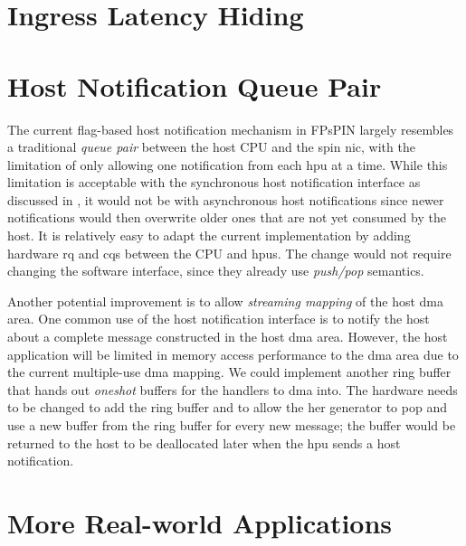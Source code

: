 \section{Ingress Latency Hiding} \label{sec:ingress-latency-hiding}

\section{Host Notification Queue Pair} \label{sec:host-dma-qp}

The current flag-based host notification mechanism in FPsPIN largely resembles a traditional \emph{queue pair} between the host CPU and the \ac{spin} \ac{nic}, with the limitation of only allowing one notification from each \ac{hpu} at a time.  While this limitation is acceptable with the synchronous host notification interface as discussed in , it would not be with asynchronous host notifications since newer notifications would then overwrite older ones that are not yet consumed by the host.  It is relatively easy to adapt the current implementation by adding hardware \ac{rq} and \ac{cq}s between the CPU and \ac{hpu}s.  The change would not require changing the software interface, since they already use \emph{push/pop} semantics.

Another potential improvement is to allow \emph{streaming mapping} of the host \ac{dma} area.  One common use of the host notification interface is to notify the host about a complete message constructed in the host \ac{dma} area.  However, the host application will be limited in memory access performance to the \ac{dma} area due to the current multiple-use \ac{dma} mapping.  We could implement another ring buffer that hands out \emph{oneshot} buffers for the handlers to \ac{dma} into.  The hardware needs to be changed to add the ring buffer and to allow the \ac{her} generator to pop and use a new buffer from the ring buffer for every new message; the buffer would be returned to the host to be deallocated later when the \ac{hpu} sends a host notification.

\section{More Real-world Applications}

